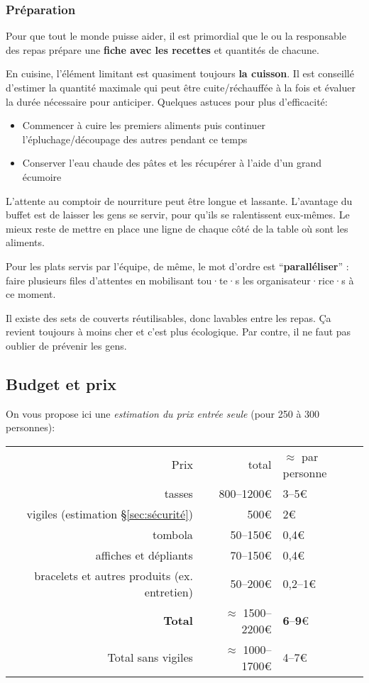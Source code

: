 \subsubsection{Préparation}

Pour que tout le monde puisse aider, il est primordial que le ou la responsable des repas prépare une \textbf{fiche avec les recettes} et quantités de chacune.

\begin{Attention}{}{}
En cuisine, l'élément limitant est quasiment toujours \textbf{la cuisson}. Il est conseillé d'estimer la quantité maximale qui peut être cuite/réchauffée à la fois et évaluer la durée nécessaire pour anticiper. Quelques astuces pour plus d'efficacité:
\begin{itemize}
    \item Commencer à cuire les premiers aliments puis continuer l'épluchage/découpage des autres pendant ce temps
    \item Conserver l'eau chaude des pâtes et les récupérer à l'aide d'un grand écumoire
\end{itemize}
\end{Attention}


\begin{Aanticiper}{}{}
L'attente au comptoir de nourriture peut être longue et lassante. L'avantage du buffet est de laisser les gens se servir, pour qu'ils se ralentissent eux-mêmes. Le mieux reste de mettre en place une ligne de chaque côté de la table où sont les aliments.

Pour les plats servis par l'équipe, de même, le mot d'ordre est ``\textbf{paralléliser}'' : faire plusieurs files d'attentes en mobilisant tou·te·s les organisateur·rice·s à ce moment.
\end{Aanticiper}

Il existe des sets de couverts réutilisables, donc lavables entre les repas. Ça revient toujours à moins cher et c'est plus écologique. Par contre, il ne faut pas oublier de prévenir les gens.

\subsection{Budget et prix}

On vous propose ici une \emph{estimation du prix entrée seule} (pour 250 à 300 personnes):

\begin{tabular}{rrl}
Prix& total& $\approx$ par personne\\
     tasses &800--1200\euro&  3--5\euro\\
     vigiles (estimation \S\ref{sec:sécurité})&500\euro& 2\euro\\
     tombola& 50--150\euro& 0,4\euro\\
     affiches et dépliants& 70--150\euro& 0,4\euro\\
     bracelets et autres produits (ex. entretien)& 50--200\euro& 0,2--1\euro\\\hline
     \textbf{Total}& $\approx$ 1500--2200\euro &\textbf{6}--\textbf{9}\euro\\
     Total sans vigiles& $\approx$ 1000--1700\euro &4--7\euro
\end{tabular}

